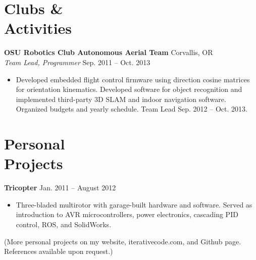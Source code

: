 \documentclass[10pt,letterpaper,margin]{res}
\begin{document}
\begin{resume}
\section{Clubs \& \\ Activities}

{\bf OSU Robotics Club Autonomous Aerial Team} \hfill {\color{lightgray} Corvallis, OR} \\
{\it Team Lead, Programmer} \hfill {\color{lightgray} Sep. 2011 -- Oct. 2013}\vspace{0.2em}

\begin{itemize}
	\item Developed embedded flight control firmware using direction cosine
		matrices for orientation kinematics. Developed software for object
		recognition and implemented third-party 3D SLAM and indoor navigation
		software. Organized budgets and yearly schedule. Team Lead Sep. 2012 --
		Oct. 2013.
\end{itemize}



\section{Personal \\ Projects}

{\bf Tricopter} \hfill {\color{lightgray} Jan. 2011 -- August 2012}\vspace{0.2em}

\begin{itemize}
	\item Three-bladed multirotor with garage-built hardware and software.
		Served as introduction to AVR microcontrollers, power electronics,
		cascading PID control, ROS, and SolidWorks.
\end{itemize}

{\footnotesize (More personal projects on my website, iterativecode.com, and
Github page. References available upon request.)}


% 

\end{resume}
\end{document}
